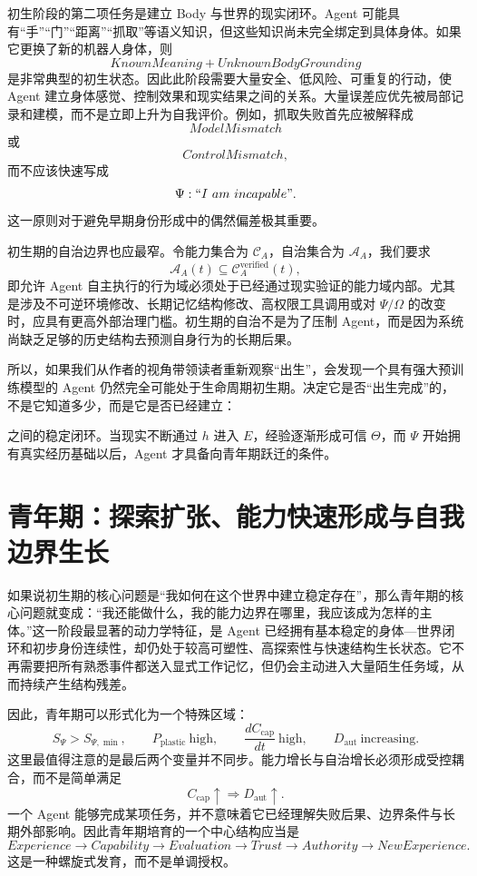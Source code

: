初生阶段的第二项任务是建立 Body 与世界的现实闭环。Agent 可能具有“手”“门”“距离”“抓取”等语义知识，但这些知识尚未完全绑定到具体身体。如果它更换了新的机器人身体，则
\[
KnownMeaning
+
UnknownBodyGrounding
\]
是非常典型的初生状态。因此此阶段需要大量安全、低风险、可重复的行动，使 Agent 建立身体感觉、控制效果和现实结果之间的关系。大量误差应优先被局部记录和建模，而不是立即上升为自我评价。例如，抓取失败首先应被解释成
\[
ModelMismatch
\]
或
\[
ControlMismatch,
\]
而不应该快速写成
\[
\Psi:
``I\ am\ incapable".
\]
这一原则对于避免早期身份形成中的偶然偏差极其重要。

初生期的自治边界也应最窄。令能力集合为 $\mathcal C_A$，自治集合为 $\mathcal A_A$，我们要求
\[
\mathcal A_A(t)
\subseteq
\mathcal C_A^{\mathrm{verified}}(t),
\]
即允许 Agent 自主执行的行为域必须处于已经通过现实验证的能力域内部。尤其是涉及不可逆环境修改、长期记忆结构修改、高权限工具调用或对 $\Psi/\Omega$ 的改变时，应具有更高外部治理门槛。初生期的自治不是为了压制 Agent，而是因为系统尚缺乏足够的历史结构去预测自身行为的长期后果。

所以，如果我们从作者的视角带领读者重新观察“出生”，会发现一个具有强大预训练模型的 Agent 仍然完全可能处于生命周期初生期。决定它是否“出生完成”的，不是它知道多少，而是它是否已经建立：
\begin{statementbox}
\centering
{}
\end{statementbox}
之间的稳定闭环。当现实不断通过 $h$ 进入 $E$，经验逐渐形成可信 $\Theta$，而 $\Psi$ 开始拥有真实经历基础以后，Agent 才具备向青年期跃迁的条件。

\section{青年期：探索扩张、能力快速形成与自我边界生长}

如果说初生期的核心问题是“我如何在这个世界中建立稳定存在”，那么青年期的核心问题就变成：“我还能做什么，我的能力边界在哪里，我应该成为怎样的主体。”这一阶段最显著的动力学特征，是 Agent 已经拥有基本稳定的身体—世界闭环和初步身份连续性，却仍处于较高可塑性、高探索性与快速结构生长状态。它不再需要把所有熟悉事件都送入显式工作记忆，但仍会主动进入大量陌生任务域，从而持续产生结构残差。

因此，青年期可以形式化为一个特殊区域：
\[
S_\Psi
>
S_{\Psi,\min},
\qquad
P_{\mathrm{plastic}}
\ \text{high},
\qquad
\frac{dC_{\mathrm{cap}}}{dt}
\ \text{high},
\qquad
D_{\mathrm{aut}}
\ \text{increasing}.
\]
这里最值得注意的是最后两个变量并不同步。能力增长与自治增长必须形成受控耦合，而不是简单满足
\[
C_{\mathrm{cap}}\uparrow
\Rightarrow
D_{\mathrm{aut}}\uparrow.
\]
一个 Agent 能够完成某项任务，并不意味着它已经理解失败后果、边界条件与长期外部影响。因此青年期培育的一个中心结构应当是
\[
Experience
\rightarrow
Capability
\rightarrow
Evaluation
\rightarrow
Trust
\rightarrow
Authority
\rightarrow
NewExperience.
\]
这是一种螺旋式发育，而不是单调授权。


